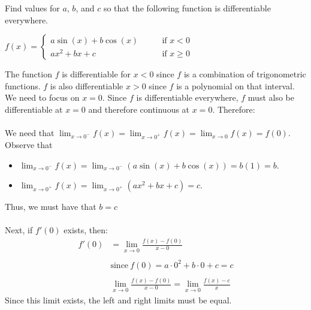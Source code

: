 \documentclass[nooutcomes]{ximera}
\begin{document}
\begin{problem}
Find values for $a$, $b$, and $c$ so that the following function is differentiable everywhere.

$f(x) =   \left\{ \begin{array}{cl}
	a \sin(x) + b \cos(x)		 	&	\qquad \text{if } x < 0					\\
	ax^2 + bx + c   				&	\qquad \text{if } x \geq 0	 \end{array} \right.  $
		\begin{freeResponse}
		The function $f$ is differentiable for $x<0$ since $f$ is a combination of trigonometric functions.  $f$ is also differentiable $x>0$ since $f$ is a polynomial on that interval.  We need to focus on $x=0$.  Since $f$ is differentiable everywhere, $f$ must also be differentiable at $x=0$ and therefore continuous at $x=0$.  Therefore: \\\\
We need that $\lim_{x \to 0^-} f(x) = \lim_{x \to 0^+} f(x)=\lim_{x \to 0} f(x)=f(0)$.  Observe that
		
		\begin{itemize}
		
		\item $\lim_{x \to 0^-} f(x) 
		= \lim_{x \to 0^-} (a\sin(x) + b\cos(x))
		= b(1) = b$.
		
		\item  $ \lim_{x \to 0^+} f(x)
		= \lim_{x \to 0^+} (ax^2 + bx + c)
		= c$.
		
		\end{itemize}
		
		Thus, we must have that $b = c$\\\\
		Next, if $f'(0)$ exists, then:
		\begin{align*}
		f'(0)&=\lim_{x\to 0} \frac{f(x)-f(0)}{x-0}\\\\
		& \text{since}\ f(0)=a \cdot 0^2+b \cdot 0 +c =c\\\\
		& \lim_{x\to 0} \frac{f(x)-f(0)}{x-0}=\lim_{x\to 0} \frac{f(x)-c}{x}
		\end{align*}
		Since this limit exists, the left and right limits must be equal.
		

\end{freeResponse}
\end{problem}
\end{document}
